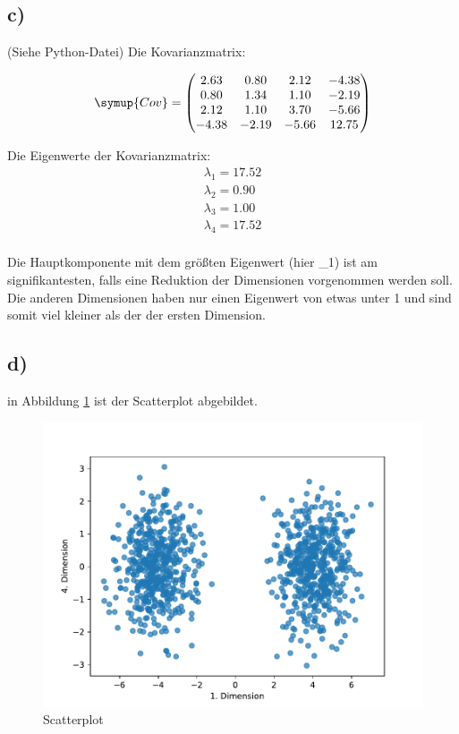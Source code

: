 \subsection{c)}
(Siehe Python-Datei) Die Kovarianzmatrix:

\begin{align*}
  \symup{Cov} = \begin{pmatrix}
                 2.63 &  0.80 &  2.12 & -4.38  \\
                 0.80 &  1.34 &  1.10 & -2.19 \\
                 2.12 &  1.10 &  3.70 & -5.66 \\
                -4.38 & -2.19 & -5.66 & 12.75 \\
  \end{pmatrix}
\end{align*}

Die Eigenwerte der Kovarianzmatrix:
\begin{align*}
  \lambda_1 = 17.52 \\
  \lambda_2 = 0.90 \\
  \lambda_3 = 1.00 \\
  \lambda_4 = 17.52 \\
\end{align*}

Die Hauptkomponente mit dem größten Eigenwert (hier \lambda_1) ist am
signifikantesten, falls eine Reduktion der Dimensionen vorgenommen werden soll.
Die anderen Dimensionen haben nur einen Eigenwert von etwas unter 1 und sind somit
viel kleiner als der der ersten Dimension. 

\subsection{d)}
in Abbildung \ref{abb:2} ist der Scatterplot abgebildet.

\begin{figure}
  \centering
  \includegraphics[scale=0.7]{Scatterplot_pca.pdf}
  \caption{Scatterplot}
  \label{abb:2}
\end{figure}

